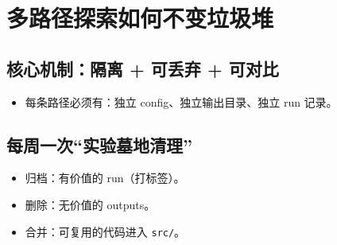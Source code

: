 \chapter{多路径探索如何不变垃圾堆}
\label{ch:multi_path}
\section{核心机制：隔离 + 可丢弃 + 可对比}
\begin{itemize}
  \item 每条路径必须有：独立 config、独立输出目录、独立 run 记录。
\end{itemize}

\section{每周一次“实验墓地清理”}
\begin{itemize}
  \item 归档：有价值的 run（打标签）。
  \item 删除：无价值的 outputs。
  \item 合并：可复用的代码进入 \texttt{src/}。
\end{itemize}